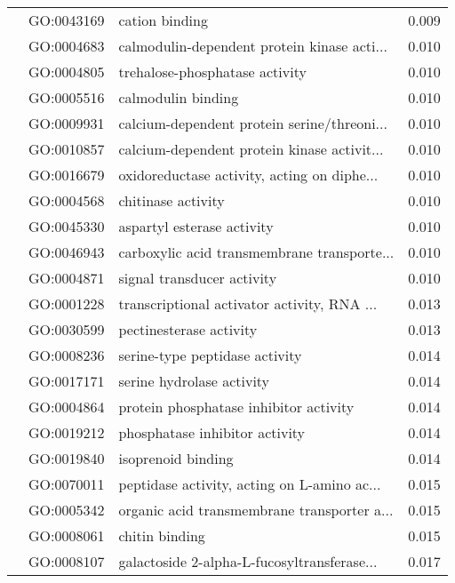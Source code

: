 \begin{longtable}{lllr}
   & GO:0043169 &                               cation binding &         0.009 \\
   & GO:0004683 &  calmodulin-dependent protein kinase acti... &         0.010 \\
   & GO:0004805 &               trehalose-phosphatase activity &         0.010 \\
   & GO:0005516 &                           calmodulin binding &         0.010 \\
   & GO:0009931 &  calcium-dependent protein serine/threoni... &         0.010 \\
   & GO:0010857 &  calcium-dependent protein kinase activit... &         0.010 \\
   & GO:0016679 &  oxidoreductase activity, acting on diphe... &         0.010 \\
   & GO:0004568 &                           chitinase activity &         0.010 \\
   & GO:0045330 &                   aspartyl esterase activity &         0.010 \\
   & GO:0046943 &  carboxylic acid transmembrane transporte... &         0.010 \\
   & GO:0004871 &                   signal transducer activity &         0.010 \\
   & GO:0001228 &  transcriptional activator activity, RNA ... &         0.013 \\
   & GO:0030599 &                      pectinesterase activity &         0.013 \\
   & GO:0008236 &               serine-type peptidase activity &         0.014 \\
   & GO:0017171 &                    serine hydrolase activity &         0.014 \\
   & GO:0004864 &       protein phosphatase inhibitor activity &         0.014 \\
   & GO:0019212 &               phosphatase inhibitor activity &         0.014 \\
   & GO:0019840 &                           isoprenoid binding &         0.014 \\
   & GO:0070011 &  peptidase activity, acting on L-amino ac... &         0.015 \\
   & GO:0005342 &  organic acid transmembrane transporter a... &         0.015 \\
   & GO:0008061 &                               chitin binding &         0.015 \\
   & GO:0008107 &  galactoside 2-alpha-L-fucosyltransferase... &         0.017 \\

\end{longtable}
